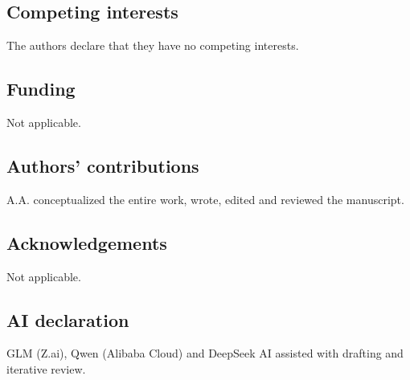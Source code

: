\documentclass[3p,11pt]{elsarticle}
\begin{document}
\subsection*{Competing interests}

The authors declare that they have no competing interests.

\subsection*{Funding}

Not applicable.

\subsection*{Authors' contributions}

A.A. conceptualized the entire work, wrote, edited and reviewed the manuscript.

\subsection*{Acknowledgements}

Not applicable.

\subsection*{AI declaration}
GLM (Z.ai), Qwen (Alibaba Cloud) and DeepSeek AI assisted with drafting and iterative review.
\end{document}
